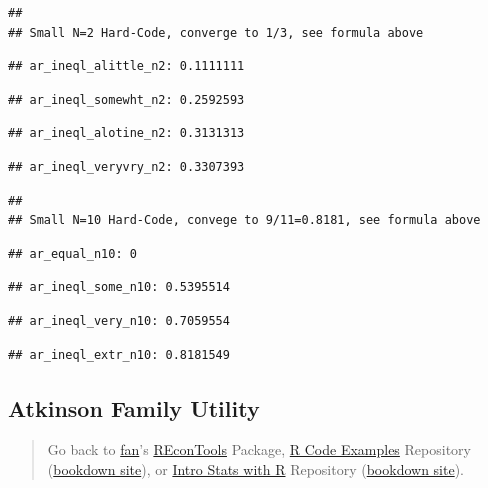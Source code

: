 \documentclass[
]{book}
\begin{document}
\begin{verbatim}
## 
## Small N=2 Hard-Code, converge to 1/3, see formula above
\end{verbatim}

\begin{verbatim}
## ar_ineql_alittle_n2: 0.1111111
\end{verbatim}

\begin{verbatim}
## ar_ineql_somewht_n2: 0.2592593
\end{verbatim}

\begin{verbatim}
## ar_ineql_alotine_n2: 0.3131313
\end{verbatim}

\begin{verbatim}
## ar_ineql_veryvry_n2: 0.3307393
\end{verbatim}

\begin{verbatim}
## 
## Small N=10 Hard-Code, convege to 9/11=0.8181, see formula above
\end{verbatim}

\begin{verbatim}
## ar_equal_n10: 0
\end{verbatim}

\begin{verbatim}
## ar_ineql_some_n10: 0.5395514
\end{verbatim}

\begin{verbatim}
## ar_ineql_very_n10: 0.7059554
\end{verbatim}

\begin{verbatim}
## ar_ineql_extr_n10: 0.8181549
\end{verbatim}

\hypertarget{atkinson-family-utility}{%
\subsection{Atkinson Family Utility}\label{atkinson-family-utility}}

\begin{quote}
Go back to \href{http://fanwangecon.github.io/}{fan}'s \href{https://fanwangecon.github.io/REconTools/}{REconTools} Package, \href{https://fanwangecon.github.io/R4Econ/}{R Code Examples} Repository (\href{https://fanwangecon.github.io/R4Econ/bookdown}{bookdown site}), or \href{https://fanwangecon.github.io/Stat4Econ/}{Intro Stats with R} Repository (\href{https://fanwangecon.github.io/Stat4Econ/bookdown}{bookdown site}).
\end{quote}
\end{document}
